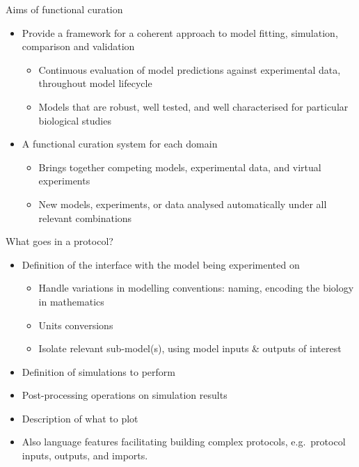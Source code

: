\documentclass[t,xcolor={usenames,dvipsnames}]{beamer}
\begin{document}

\begin{frame}{Aims of functional curation}
\begin{itemize}
\item Provide a framework for a coherent approach to model fitting, simulation, comparison and validation
  \begin{itemize}
  \item Continuous evaluation of model predictions against experimental data, throughout model lifecycle
  \item Models that are robust, well tested, and well characterised for particular biological studies
  \end{itemize}
\item A functional curation system \alert{for each domain}
  \begin{itemize}
  \item Brings together competing models, experimental data, and virtual experiments
  \item New models, experiments, or data analysed automatically under all relevant combinations
  \end{itemize}
\end{itemize}
\end{frame}


\begin{frame}{What goes in a protocol?}
\begin{itemize}
\item Definition of the interface with the model being experimented on
  \begin{itemize}
  \item Handle variations in modelling conventions: naming, encoding the biology in mathematics
  \item Units conversions
  \item Isolate relevant sub-model(s), using model inputs \& outputs of interest
  \end{itemize}
\item Definition of simulations to perform
\item Post-processing operations on simulation results
\item Description of what to plot
\vspace{.5cm}
\item Also language features facilitating building complex protocols, e.g.\ protocol inputs, outputs, and imports.
\end{itemize}
\end{frame}
\end{document}
